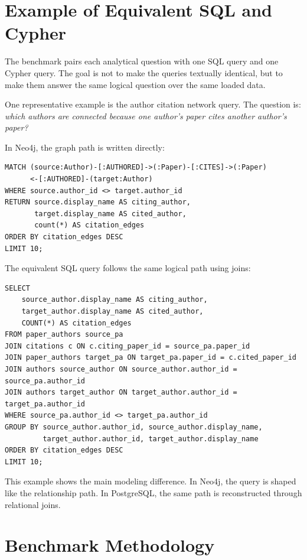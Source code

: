 \documentclass[11pt]{article}
\begin{document}
\section{Example of Equivalent SQL and Cypher}

The benchmark pairs each analytical question with one SQL query and one Cypher query.
The goal is not to make the queries textually identical, but to make them answer the same logical question over the same loaded data.

One representative example is the author citation network query.
The question is: \textit{which authors are connected because one author's paper cites another author's paper?}

In Neo4j, the graph path is written directly:

\begin{verbatim}
MATCH (source:Author)-[:AUTHORED]->(:Paper)-[:CITES]->(:Paper)
      <-[:AUTHORED]-(target:Author)
WHERE source.author_id <> target.author_id
RETURN source.display_name AS citing_author,
       target.display_name AS cited_author,
       count(*) AS citation_edges
ORDER BY citation_edges DESC
LIMIT 10;
\end{verbatim}

The equivalent SQL query follows the same logical path using joins:

\begin{verbatim}
SELECT
    source_author.display_name AS citing_author,
    target_author.display_name AS cited_author,
    COUNT(*) AS citation_edges
FROM paper_authors source_pa
JOIN citations c ON c.citing_paper_id = source_pa.paper_id
JOIN paper_authors target_pa ON target_pa.paper_id = c.cited_paper_id
JOIN authors source_author ON source_author.author_id = source_pa.author_id
JOIN authors target_author ON target_author.author_id = target_pa.author_id
WHERE source_pa.author_id <> target_pa.author_id
GROUP BY source_author.author_id, source_author.display_name,
         target_author.author_id, target_author.display_name
ORDER BY citation_edges DESC
LIMIT 10;
\end{verbatim}

This example shows the main modeling difference.
In Neo4j, the query is shaped like the relationship path.
In PostgreSQL, the same path is reconstructed through relational joins.

\section{Benchmark Methodology}
\end{document}
